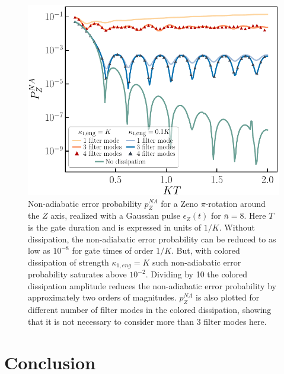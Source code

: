 \documentclass[%
 reprint,
 superscriptaddress,
 amsmath,
 amssymb,
 aps,
 pra,
 10pt
]{revtex4-2}
\newcommand{\nbar}{\bar{n}}
\begin{document}
\begin{figure}[t!]
    \includegraphics[width=\columnwidth]{image/Zgate_V2.pdf}
    \vspace{-0.6cm}
    \caption{\label{fig:Zgate}
    Non-adiabatic error probability $p_Z^{NA}$ for a Zeno $\pi$-rotation around the $Z$ axis, realized with a Gaussian pulse $\epsilon_Z(t)$ for $\nbar = 8$. Here $T$ is the gate duration and is expressed in units of $1/K$. Without dissipation, the non-adiabatic error probability can be reduced to as low as $10^{-8}$ for gate times of order $1/K$. But, with colored dissipation of strength $\kappa_{1,eng} = K$ such non-adiabatic error probability saturates above $10^{-2}$. Dividing by 10 the colored dissipation amplitude reduces the non-adiabatic error probability by approximately two orders of magnitudes. $p_Z^{NA}$ is also plotted for different number of filter modes in the colored dissipation, showing that it is not necessary to consider more than 3 filter modes here.
    }
\end{figure}


\section{\label{sec:level9}Conclusion}
\end{document}
